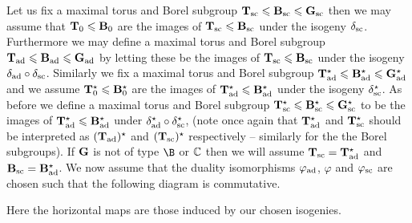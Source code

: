 \documentclass[eqthmnum]{jt-calcs}
\begin{document}
\begin{pa}
Let us fix a maximal torus and Borel subgroup $\mathbf{T}_{\operatorname{sc}} \leqslant \mathbf{B}_{\operatorname{sc}} \leqslant \mathbf{G}_{\operatorname{sc}}$ then we may assume that $\mathbf{T}_0 \leqslant \mathbf{B}_0$ are the images of $\mathbf{T}_{\operatorname{sc}}\leqslant\mathbf{B}_{\operatorname{sc}}$ under the isogeny $\delta_{\operatorname{sc}}$. Furthermore we may define a maximal torus and Borel subgroup $\mathbf{T}_{\operatorname{ad}} \leqslant \mathbf{B}_{\operatorname{ad}} \leqslant \mathbf{G}_{\operatorname{ad}}$ by letting these be the images of $\mathbf{T}_{\operatorname{sc}} \leqslant \mathbf{B}_{\operatorname{sc}}$ under the isogeny $\delta_{\operatorname{ad}} \circ \delta_{\operatorname{sc}}$. Similarly we fix a maximal torus and Borel subgroup $\mathbf{T}_{\operatorname{ad}}^{\star} \leqslant \mathbf{B}_{\operatorname{ad}}^{\star} \leqslant \mathbf{G}_{\operatorname{ad}}^{\star}$ and we assume $\mathbf{T}_0^{\star} \leqslant \mathbf{B}_0^{\star}$ are the images of $\mathbf{T}_{\operatorname{ad}}^{\star} \leqslant \mathbf{B}_{\operatorname{ad}}^{\star}$ under the isogeny $\delta_{\operatorname{sc}}^{\star}$. As before we define a maximal torus and Borel subgroup $\mathbf{T}_{\operatorname{sc}}^{\star} \leqslant \mathbf{B}_{\operatorname{sc}}^{\star} \leqslant \mathbf{G}_{\operatorname{sc}}^{\star}$ to be the images of $\mathbf{T}_{\operatorname{ad}}^{\star} \leqslant \mathbf{B}_{\operatorname{ad}}^{\star}$ under $\delta_{\operatorname{ad}}^{\star}\circ\delta_{\operatorname{sc}}^{\star}$, (note once again that $\mathbf{T}_{\operatorname{ad}}^{\star}$ and $\mathbf{T}_{\operatorname{sc}}^{\star}$ should be interpreted as $(\mathbf{T}_{\operatorname{ad}})^{\star}$ and $(\mathbf{T}_{\operatorname{sc}})^{\star}$ respectively -- similarly for the the Borel subgroups). If $\mathbf{G}$ is not of type $\B$ or ${\mathbb C}$ then we will assume $\mathbf{T}_{\operatorname{sc}} = \mathbf{T}_{\operatorname{ad}}^{\star}$ and $\mathbf{B}_{\operatorname{sc}} = \mathbf{B}_{\operatorname{ad}}^{\star}$. We now assume that the duality isomorphisms $\varphi_{\operatorname{ad}}$, $\varphi$ and $\varphi_{\operatorname{sc}}$ are chosen such that the following diagram is commutative.

\begin{center}
\end{center}

\noindent Here the horizontal maps are those induced by our chosen isogenies.


\end{pa}
\end{document}
